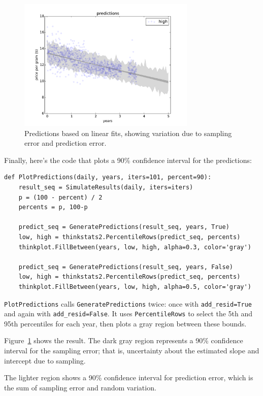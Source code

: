 \documentclass[12pt]{book}
\begin{document}
\begin{figure}
\centerline{\includegraphics[height=2.5in]{figs/timeseries4.pdf}}
\caption{Predictions based on linear fits, showing variation due
to sampling error and prediction error.}
\label{timeseries4}
\end{figure}

Finally, here's the code that plots a 90\% confidence interval for
the predictions:

\begin{verbatim}
def PlotPredictions(daily, years, iters=101, percent=90):
    result_seq = SimulateResults(daily, iters=iters)
    p = (100 - percent) / 2
    percents = p, 100-p

    predict_seq = GeneratePredictions(result_seq, years, True)
    low, high = thinkstats2.PercentileRows(predict_seq, percents)
    thinkplot.FillBetween(years, low, high, alpha=0.3, color='gray')

    predict_seq = GeneratePredictions(result_seq, years, False)
    low, high = thinkstats2.PercentileRows(predict_seq, percents)
    thinkplot.FillBetween(years, low, high, alpha=0.5, color='gray')
\end{verbatim}

{\tt PlotPredictions} calls {\tt GeneratePredictions} twice: once
with \verb"add_resid=True" and again with \verb"add_resid=False".
It uses {\tt PercentileRows} to select the 5th and 95th percentiles
for each year, then plots a gray region between these bounds.

Figure~\ref{timeseries4} shows the result.
The dark gray region represents a 90\% confidence interval for
the sampling error; that is, uncertainty about the estimated
slope and intercept due to sampling.

The lighter region shows
a 90\% confidence interval for prediction error, which is the
sum of sampling error and random variation.
\end{document}
